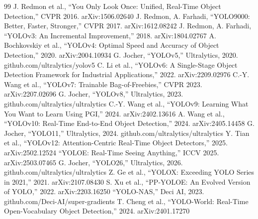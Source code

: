 \begin{thebibliography}{99}
 J. Redmon et al., ``You Only Look Once: Unified, Real-Time Object Detection,'' CVPR 2016. arXiv:1506.02640
 J. Redmon, A. Farhadi, ``YOLO9000: Better, Faster, Stronger,'' CVPR 2017. arXiv:1612.08242
 J. Redmon, A. Farhadi, ``YOLOv3: An Incremental Improvement,'' 2018. arXiv:1804.02767
 A. Bochkovskiy et al., ``YOLOv4: Optimal Speed and Accuracy of Object Detection,'' 2020. arXiv:2004.10934
 G. Jocher, ``YOLOv5,'' Ultralytics, 2020. github.com/ultralytics/yolov5
 C. Li et al., ``YOLOv6: A Single-Stage Object Detection Framework for Industrial Applications,'' 2022. arXiv:2209.02976
 C.-Y. Wang et al., ``YOLOv7: Trainable Bag-of-Freebies,'' CVPR 2023. arXiv:2207.02696
 G. Jocher, ``YOLOv8,'' Ultralytics, 2023. github.com/ultralytics/ultralytics
 C.-Y. Wang et al., ``YOLOv9: Learning What You Want to Learn Using PGI,'' 2024. arXiv:2402.13616
 A. Wang et al., ``YOLOv10: Real-Time End-to-End Object Detection,'' 2024. arXiv:2405.14458
 G. Jocher, ``YOLO11,'' Ultralytics, 2024. github.com/ultralytics/ultralytics
 Y. Tian et al., ``YOLOv12: Attention-Centric Real-Time Object Detectors,'' 2025. arXiv:2502.12524
 ``YOLOE: Real-Time Seeing Anything,'' ICCV 2025. arXiv:2503.07465
 G. Jocher, ``YOLO26,'' Ultralytics, 2026. github.com/ultralytics/ultralytics
 Z. Ge et al., ``YOLOX: Exceeding YOLO Series in 2021,'' 2021. arXiv:2107.08430
 S. Xu et al., ``PP-YOLOE: An Evolved Version of YOLO,'' 2022. arXiv:2203.16250
 ``YOLO-NAS,'' Deci AI, 2023. github.com/Deci-AI/super-gradients
 T. Cheng et al., ``YOLO-World: Real-Time Open-Vocabulary Object Detection,'' 2024. arXiv:2401.17270
\end{thebibliography}

